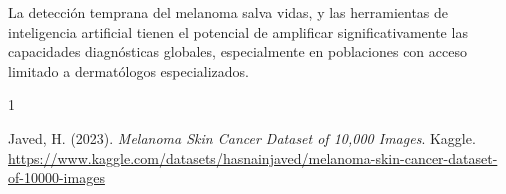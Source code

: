 \documentclass[11pt, a4paper]{article}
\begin{document}
La detección temprana del melanoma salva vidas, y las herramientas de inteligencia artificial tienen el potencial de amplificar significativamente las capacidades diagnósticas globales, especialmente en poblaciones con acceso limitado a dermatólogos especializados.

\begin{thebibliography}{1}

Javed, H. (2023). \textit{Melanoma Skin Cancer Dataset of 10,000 Images}. Kaggle. \\
\url{https://www.kaggle.com/datasets/hasnainjaved/melanoma-skin-cancer-dataset-of-10000-images}

\end{thebibliography}
\end{document}
